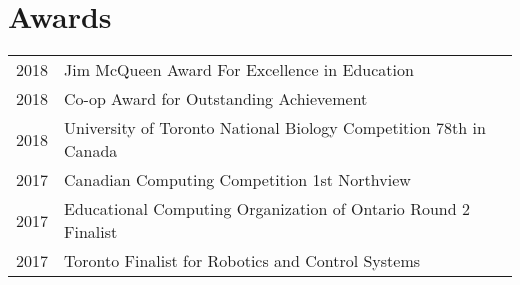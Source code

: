 \documentclass[]{chandan-cv}
\begin{document}
\begin{minipage}[t]{0.66\textwidth}

\section{Awards} 
\begin{tabular}{rll}
2018		&	Jim McQueen Award For Excellence in Education\\
2018		&	Co-op Award for Outstanding Achievement\\
2018		& 	University of Toronto National Biology Competition 78th in Canada\\
2017		&	Canadian Computing Competition 1st Northview\\
2017		&	Educational Computing Organization of Ontario Round 2 Finalist\\
2017		&	Toronto Finalist for Robotics and Control Systems\\
\end{tabular}
\sectionsep

%
%

\end{minipage} 
\end{document}
